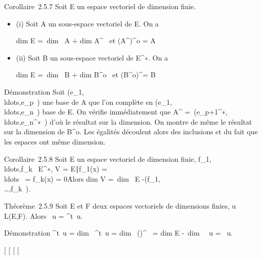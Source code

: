 \documentclass[]{article}
\begin{document}
Corollaire~2.5.7 Soit E un espace vectoriel de dimension finie.

\begin{itemize}
\item
  (i) Soit A un sous-espace vectoriel de E. On a

  dim E =\ dim~ A
  + dim A^\bot~\text
  et (A^\bot)^o = A
\item
  (ii) Soit B un sous-espace vectoriel de E^∗. On a

  dim E =\ dim~ B
  + dim B^o~\text
  et (B^o)^\bot = B
\end{itemize}

Démonstration Soit
(e\_1,\\ldots,e\_p~)
une base de A que l'on complète en
(e\_1,\\ldots,e\_n~)
base de E. On vérifie immédiatement que A^\bot
=\
\mathrmVect(e\_p+1^∗,\\ldots,e\_n^∗~)
d'où le résultat sur la dimension. On montre de même le résultat sur la
dimension de B^o. Les égalités découlent alors des inclusions
et du fait que les espaces ont même dimension.

Corollaire~2.5.8 Soit E un espace vectoriel de dimension finie,
f\_1,\\ldots,f\_k~
\in E^∗, V = \x \in
E∣f\_1(x) =
\\ldots~ =
f\_k(x) = 0\. Alors
dim V =\ dim~ E
-\mathrmrg(f\_1,\\\ldots,f\_k~).

Théorème~2.5.9 Soit E et F deux espaces vectoriels de dimensions finies,
u \in L(E,F). Alors
\mathrmrg~u
= \mathrmrg^t~u.

Démonstration
\mathrmrg^t~u
= dim~
\mathrmIm^t~u
= dim~
(\mathrmKeru)^\bot~
= dim E -\ dim~
\mathrmKer~u
= \mathrmrg~u.

{[}
{[}
{[}
{[}
\end{document}
